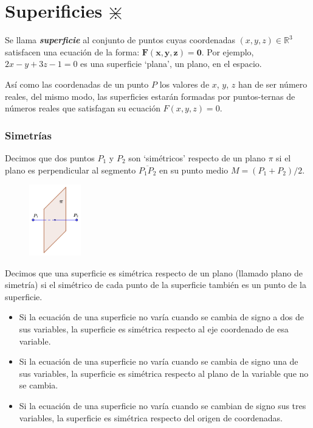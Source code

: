 
\chapter{Superificies $\divideontimes$}

Se llama \textbf{\textit{superficie}}	 al conjunto de puntos cuyas coordenadas $(x,y,z)\in\mathbb R^3$ satisfacen una ecuación de la forma: $\boldsymbol{ F(x,y,z)=0 }$. \textcolor{gris}{Por ejemplo, $2x-y+3z-1=0$ es una superficie `plana', un plano, en el espacio.}
	
Así como las coordenadas de un punto $P$ los valores de $x$, $y$, $z$ han de ser número reales, del mismo modo, las superficies estarán formadas por puntos-ternas de números reales que satisfagan su ecuación $F(x,y,z)=0$. 

\subsection{Simetrías}

	\begin{multicols}{2}
	Decimos que dos puntos $P_1$ y $P_2$ son `simétricos'  respecto de un plano $\pi$ si el plano es perpendicular al segmento $\overline{ P_1P_2 }$ en su punto medio $M=(P_1+P_2)/2$.

	\begin{figure}[H]
		\centering
		\includegraphics[width=0.2\textwidth]{imagenes/imagenes12/T12IM01.png}
	\end{figure}
	\end{multicols}
	

Decimos que una superficie es simétrica respecto de un plano (llamado plano de simetría) si el simétrico de cada punto de la superficie también es un punto de la superficie.

\begin{itemize}
\item Si la ecuación de una superficie no varía cuando se cambia de signo a dos de sus variables, la superficie es simétrica respecto al eje coordenado de esa variable.
\item Si la ecuación de una superficie no varía cuando se cambia de signo una de sus variables, la superficie es simétrica respecto al plano de la variable que no se cambia.
\item Si la ecuación de una superficie no varía cuando se cambian de signo sus tres variables, la superficie es simétrica respecto del origen de coordenadas.
\end{itemize}



